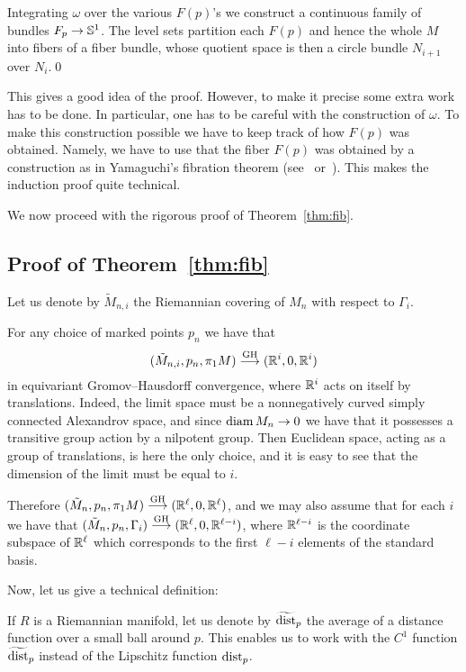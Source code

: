 \documentclass{amsart}
\begin{document}
Integrating $\omega$ over the various $F(p)$'s
we construct a continuous family of bundles $F_p\to {\Bbb S}^{1}$.
The level sets
partition each $F(p)$ and hence the whole $M$ into fibers of a fiber bundle,
whose quotient space is then a circle bundle $N_{i+1}$ over $N_i$.\qed

\medskip

This gives a good idea of the proof.
However, to make it precise some extra work has to be done.
In particular,  one has to be careful with the construction of $\omega$.
To make this construction possible
we have to keep track of how $F(p)$  was obtained.
Namely, we have to use that the fiber $F(p)$
was obtained by a construction as in Yamaguchi's
fibration theorem (see~\cite{Yam} or~\cite{BGP}).
This makes the induction proof quite technical.

We now proceed with the rigorous proof of Theorem~\ref{thm:fib}.

\subsection{Proof of Theorem~\ref{thm:fib}}
Let us denote by  $\tilde M_{n,i}$
the Riemannian covering of $M_n$ with respect to $\Gamma_i$.

For any choice of marked points $p_n$
we have that
$$(\tilde M_{n,i},p_n,\pi_1M)\GHto ({\Bbb R}^i,0,{\Bbb R}^i)$$
in equivariant Gromov--Hausdorff convergence,
where ${\Bbb R}^i$ acts on itself by translations.
Indeed, the limit space must be a
nonnegatively curved simply connected Alexandrov space,
and since $\operatorname{\rm diam} M_n\to0$ we have that it possesses
a transitive group action by a nilpotent group.
Then Euclidean space, acting as a group of translations,
is here the only choice,
and it is easy to see that the dimension of the limit  must be equal to $i$.

Therefore $(\tilde M_{n},p_n,\pi_1M)\GHto ({\Bbb R}^\ell,0,{\Bbb R}^\ell)$,
and we may also assume that for each $i$
we have that $(\tilde M_{n},p_n,\Gamma_i)\GHto ({\Bbb R}^\ell,0, {\Bbb R}^{\ell-i})$,
where ${\Bbb R}^{\ell-i}$ is the coordinate subspace of ${\Bbb R}^\ell$
which corresponds to the first $\ell-i$ elements of the standard basis.

Now, let us give a technical definition:


If $R$ is a Riemannian manifold,
let us denote by $\widetilde{\operatorname{\rm dist}}_p$ the average of a distance function
over a small ball around $p$.
This enables us
to work with the $C^{1}$  function $\widetilde{\operatorname{\rm dist}}_p$
instead of the Lipschitz function $\operatorname{\rm dist}_p$.
\end{document}
